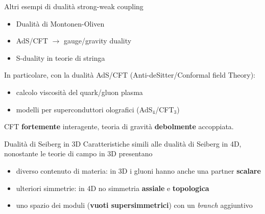 \documentclass[10pt,compress,usenames,dvipsnames]{beamer}
\begin{document}
\begin{frame}{Altri esempi di dualità strong-weak coupling}

\begin{itemize}
\item Dualità di Montonen-Oliven
\item AdS/CFT $\rightarrow$ gauge/gravity duality 
\item S-duality in teorie di stringa
\end{itemize}

In particolare, con la dualità AdS/CFT (Anti-deSitter/Conformal field Theory):
\begin{itemize}
\item calcolo viscosità del quark/gluon plasma
\item modelli per superconduttori olografici (AdS$_4$/CFT$_3$)
\end{itemize}

CFT \alert{\bfseries fortemente} interagente, teoria di gravità \alert{\bfseries debolmente} accoppiata.

\end{frame}



\begin{frame}{Dualità di Seiberg in 3D}
Caratteristiche simili alle dualità di Seiberg in 4D, nonostante le teorie di campo in 3D presentano
\begin{itemize}
\item diverso contenuto di materia: in 3D i gluoni hanno anche una partner \alert{\bfseries scalare} 
\item ulteriori simmetrie: in 4D no simmetria \alert{\bfseries assiale} e \alert{\bfseries topologica} 
\item uno spazio dei moduli (\alert{\bfseries vuoti supersimmetrici}) con un \emph{branch} aggiuntivo  
\end{itemize}
\vspace{0,3cm}

\end{frame}
\end{document}
